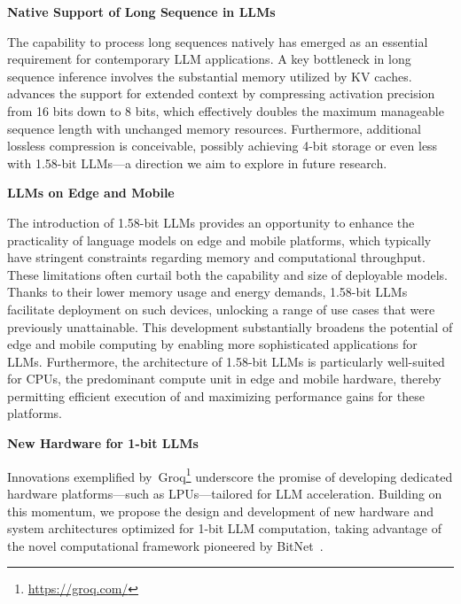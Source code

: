 \textbf{Native Support of Long Sequence in LLMs}

The capability to process long sequences natively has emerged as an essential requirement for contemporary LLM applications. A key bottleneck in long sequence inference involves the substantial memory utilized by KV caches.  advances the support for extended context by compressing activation precision from 16 bits down to 8 bits, which effectively doubles the maximum manageable sequence length with unchanged memory resources. Furthermore, additional lossless compression is conceivable, possibly achieving 4-bit storage or even less with 1.58-bit LLMs—a direction we aim to explore in future research.

\textbf{LLMs on Edge and Mobile}

The introduction of 1.58-bit LLMs provides an opportunity to enhance the practicality of language models on edge and mobile platforms, which typically have stringent constraints regarding memory and computational throughput. These limitations often curtail both the capability and size of deployable models. Thanks to their lower memory usage and energy demands, 1.58-bit LLMs facilitate deployment on such devices, unlocking a range of use cases that were previously unattainable. This development substantially broadens the potential of edge and mobile computing by enabling more sophisticated applications for LLMs. Furthermore, the architecture of 1.58-bit LLMs is particularly well-suited for CPUs, the predominant compute unit in edge and mobile hardware, thereby permitting efficient execution of  and maximizing performance gains for these platforms.

\textbf{New Hardware for 1-bit LLMs}

Innovations exemplified by~Groq\footnote{\url{https://groq.com/}} underscore the promise of developing dedicated hardware platforms—such as LPUs—tailored for LLM acceleration. Building on this momentum, we propose the design and development of new hardware and system architectures optimized for 1-bit LLM computation, taking advantage of the novel computational framework pioneered by BitNet~\cite{bitnet}.